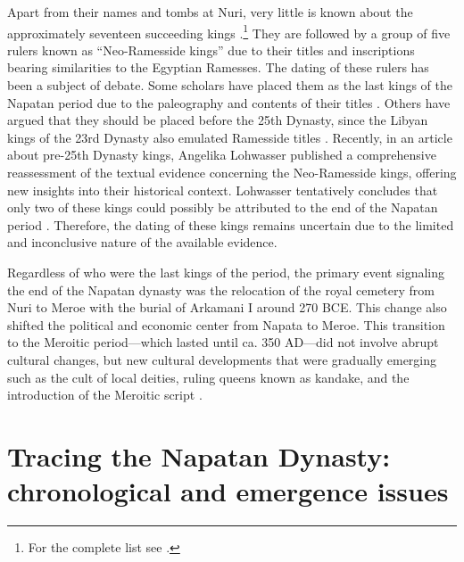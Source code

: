 Apart from their names and tombs at Nuri, very little is known about the approximately seventeen succeeding kings \parencites[p.~435]{williamsNapatanNeoKushiteState2020}[p.~139]{emberlingKushDynastyNapata2023}.\footnote{For the complete list see \cite[p.~496-497]{hornungKushiteRulersPre25th2006}.} They are followed by a group of five rulers known as “Neo-Ramesside kings” due to their titles and inscriptions bearing similarities to the Egyptian Ramesses. The dating of these rulers has been a subject of debate. Some scholars have placed them as the last kings of the Napatan period due to the paleography and contents of their titles \parencite[p.~293]{torokTwoWorldsFrontier2009}. Others have argued that they should be placed before the 25th Dynasty, since the Libyan kings of the 23rd Dynasty also emulated Ramesside titles \parencites[p.~216-217]{morkotEmptyYearsNubian1991}[p.~145-150]{morkotBlackPharaohsEgypts2000}[p.~63-64]{kendallOriginNapatanState1999}. Recently, in an article about pre-25th Dynasty kings, Angelika Lohwasser published a comprehensive reassessment of the textual evidence concerning the Neo-Ramesside kings, offering new insights into their historical context. Lohwasser tentatively concludes that only two of these kings could possibly be attributed to the end of the Napatan period \parencite[p.~132-134]{lohwasserKushiteKingsTwentyfifth2022}. Therefore, the dating of these kings remains uncertain due to the limited and inconclusive nature of the available evidence.

Regardless of who were the last kings of the period, the primary event signaling the end of the Napatan dynasty was the relocation of the royal cemetery from Nuri to Meroe with the burial of Arkamani I around 270 BCE. This change also shifted the political and economic center from Napata to Meroe. This transition to the Meroitic period—which lasted until ca. 350 AD—did not involve abrupt cultural changes, but new cultural developments that were gradually emerging such as the cult of local deities, ruling queens known as kandake, and the  introduction of the Meroitic script \parencites[p.~144]{elhassanRoleEarlyNapatan2023}[p.~2]{kuckertzMeroeEgypt2021}.

\section{Tracing the Napatan Dynasty: chronological and emergence issues}

